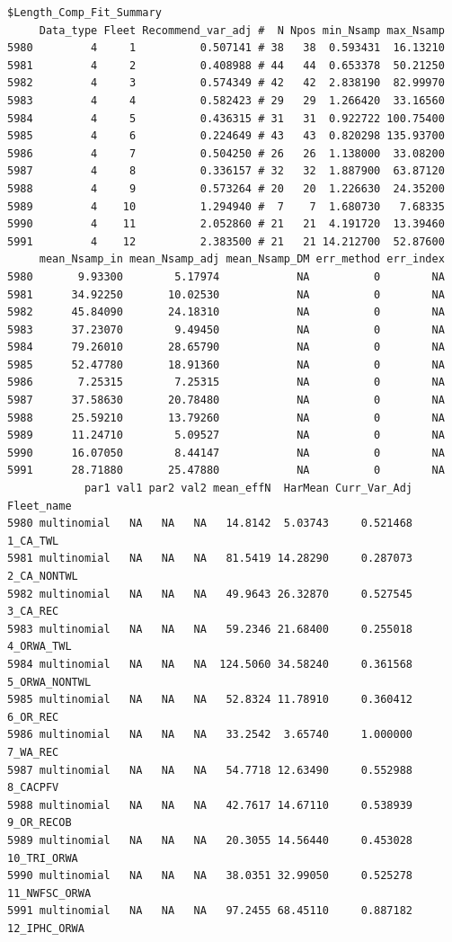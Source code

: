 \documentclass[
]{scrartcl}
\begin{document}
\begin{verbatim}
$Length_Comp_Fit_Summary
     Data_type Fleet Recommend_var_adj #  N Npos min_Nsamp max_Nsamp
5980         4     1          0.507141 # 38   38  0.593431  16.13210
5981         4     2          0.408988 # 44   44  0.653378  50.21250
5982         4     3          0.574349 # 42   42  2.838190  82.99970
5983         4     4          0.582423 # 29   29  1.266420  33.16560
5984         4     5          0.436315 # 31   31  0.922722 100.75400
5985         4     6          0.224649 # 43   43  0.820298 135.93700
5986         4     7          0.504250 # 26   26  1.138000  33.08200
5987         4     8          0.336157 # 32   32  1.887900  63.87120
5988         4     9          0.573264 # 20   20  1.226630  24.35200
5989         4    10          1.294940 #  7    7  1.680730   7.68335
5990         4    11          2.052860 # 21   21  4.191720  13.39460
5991         4    12          2.383500 # 21   21 14.212700  52.87600
     mean_Nsamp_in mean_Nsamp_adj mean_Nsamp_DM err_method err_index
5980       9.93300        5.17974            NA          0        NA
5981      34.92250       10.02530            NA          0        NA
5982      45.84090       24.18310            NA          0        NA
5983      37.23070        9.49450            NA          0        NA
5984      79.26010       28.65790            NA          0        NA
5985      52.47780       18.91360            NA          0        NA
5986       7.25315        7.25315            NA          0        NA
5987      37.58630       20.78480            NA          0        NA
5988      25.59210       13.79260            NA          0        NA
5989      11.24710        5.09527            NA          0        NA
5990      16.07050        8.44147            NA          0        NA
5991      28.71880       25.47880            NA          0        NA
            par1 val1 par2 val2 mean_effN  HarMean Curr_Var_Adj    Fleet_name
5980 multinomial   NA   NA   NA   14.8142  5.03743     0.521468      1_CA_TWL
5981 multinomial   NA   NA   NA   81.5419 14.28290     0.287073   2_CA_NONTWL
5982 multinomial   NA   NA   NA   49.9643 26.32870     0.527545      3_CA_REC
5983 multinomial   NA   NA   NA   59.2346 21.68400     0.255018    4_ORWA_TWL
5984 multinomial   NA   NA   NA  124.5060 34.58240     0.361568 5_ORWA_NONTWL
5985 multinomial   NA   NA   NA   52.8324 11.78910     0.360412      6_OR_REC
5986 multinomial   NA   NA   NA   33.2542  3.65740     1.000000      7_WA_REC
5987 multinomial   NA   NA   NA   54.7718 12.63490     0.552988      8_CACPFV
5988 multinomial   NA   NA   NA   42.7617 14.67110     0.538939    9_OR_RECOB
5989 multinomial   NA   NA   NA   20.3055 14.56440     0.453028   10_TRI_ORWA
5990 multinomial   NA   NA   NA   38.0351 32.99050     0.525278 11_NWFSC_ORWA
5991 multinomial   NA   NA   NA   97.2455 68.45110     0.887182  12_IPHC_ORWA


\end{verbatim}
\end{document}
